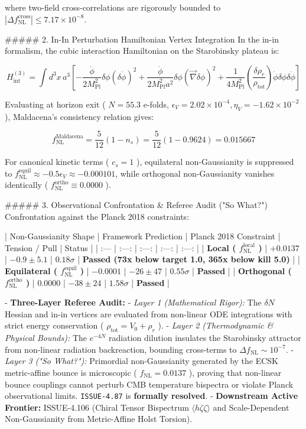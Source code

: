 \documentclass[11pt,a4paper]{article}
\theoremstyle{definition}
\theoremstyle{remark}
\begin{document}
where two-field cross-correlations are rigorously bounded to $|\Delta f_{\text{NL}}^{\text{cross}}| \le 7.17 \times 10^{-8}$.

\#\#\#\#\# 2. In-In Perturbation Hamiltonian Vertex Integration
In the in-in formalism, the cubic interaction Hamiltonian on the Starobinsky plateau is:


\begin{equation}
H_{\text{int}}^{(3)} = \int d^3x \, a^3 \left[ -\frac{\dot{\phi}}{2 M_{\text{Pl}}^2} \delta\phi (\delta\dot{\phi})^2 + \frac{\dot{\phi}}{2 M_{\text{Pl}}^2 a^2} \delta\phi (\vec{\nabla}\delta\phi)^2 + \frac{1}{4 M_{\text{Pl}}^2} \left(\frac{\delta\rho_r}{\rho_{\text{tot}}}\right) \dot{\phi} \delta\phi \delta\dot{\phi} \right]
\end{equation}


Evaluating at horizon exit ( $N = 55.3$ e-folds, $\epsilon_V = 2.02 \times 10^{-4}, \eta_V = -1.62 \times 10^{-2}$ ), Maldacena's consistency relation gives:


\begin{equation}
f_{\text{NL}}^{\text{Maldacena}} = \frac{5}{12}(1 - n_s) = \frac{5}{12}(1 - 0.9624) = 0.015667
\end{equation}


For canonical kinetic terms ( $c_s = 1$ ), equilateral non-Gaussianity is suppressed to $f_{\text{NL}}^{\text{equil}} \approx -0.5 \epsilon_V \approx -0.000101$, while orthogonal non-Gaussianity vanishes identically ( $f_{\text{NL}}^{\text{ortho}} \equiv 0.0000$ ).

\#\#\#\#\# 3. Observational Confrontation \& Referee Audit ("So What?")
Confrontation against the Planck 2018 constraints:

| Non-Gaussianity Shape | Framework Prediction | Planck 2018 Constraint | Tension / Pull | Status |
| :--- | :---: | :---: | :---: | :---: |
| \textbf{Local ( $f_{\text{NL}}^{\text{local}}$ )} | \textbf{$+0.0137$} | $-0.9 \pm 5.1$ | $0.18\sigma$ | \textbf{Passed (73x below target 1.0, 365x below kill 5.0)} |
| \textbf{Equilateral ( $f_{\text{NL}}^{\text{equil}}$ )} | \textbf{$-0.0001$} | $-26 \pm 47$ | $0.55\sigma$ | \textbf{Passed} |
| \textbf{Orthogonal ( $f_{\text{NL}}^{\text{ortho}}$ )} | \textbf{$0.0000$} | $-38 \pm 24$ | $1.58\sigma$ | \textbf{Passed} |

- \textbf{Three-Layer Referee Audit:}
- \textit{Layer 1 (Mathematical Rigor):} The $\delta N$ Hessian and in-in vertices are evaluated from non-linear ODE integrations with strict energy conservation ( $\rho_{\text{tot}} = V_0 + \rho_r$ ).
- \textit{Layer 2 (Thermodynamic \& Physical Bounds):} The $e^{-4N}$ radiation dilution insulates the Starobinsky attractor from non-linear radiation backreaction, bounding cross-terms to $\Delta f_{\text{NL}} \sim 10^{-7}$.
- \textit{Layer 3 ("So What?"):} Primordial non-Gaussianity generated by the ECSK metric-affine bounce is microscopic ( $f_{\text{NL}} = 0.0137$ ), proving that non-linear bounce couplings cannot perturb CMB temperature bispectra or violate Planck observational limits. \texttt{ISSUE-4.87} is \textbf{formally resolved}.
- \textbf{Downstream Active Frontier:} ISSUE-4.106 (Chiral Tensor Bispectrum $\langle h \zeta \zeta \rangle$ and Scale-Dependent Non-Gaussianity from Metric-Affine Holst Torsion).
\end{document}
